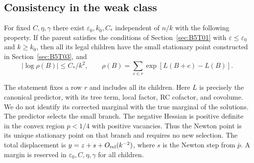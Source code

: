 \subsection{Consistency in the weak class}\label{sec:B5T05}
\begin{teorema}\label{thm:meso}
For fixed $C,\eta,\gamma$ there exist $\varepsilon_0,k_0,C_*$ independent
of $n/k$ with the following property. If the parent satisfies the conditions of Section~\ref{sec:B5T01} with
$\varepsilon\le\varepsilon_0$ and $k\ge k_0$, then all its legal children
have the small stationary point constructed in Section~\ref{sec:B5T03}, and
\[
 \boxed{\left|\log\rho(B)\right|\le C_*/k^2,\qquad
 \rho(B)=\sum_{c\in r}\exp[L(B+c)-L(B)].}
\]
\end{teorema}
The statement fixes a row $r$ and includes all its children. Here $L$ is precisely
the canonical predictor, with its tree term, local factor, RC cofactor, and covolume.
We do not identify its corrected marginal with the true marginal of the solutions.
The predictor selects the small branch. The negative Hessian
is positive definite in the convex region $p<1/4$ with positive vacancies.
Thus the Newton point is its unique stationary point on that branch and requires no new selection.
The total displacement is $y=z+s+O_{\rm rel}(k^{-2})$, where $s$ is the Newton step from $\bar p$.
A margin is reserved in $\varepsilon_0,C,\eta,\gamma$ for all children.

